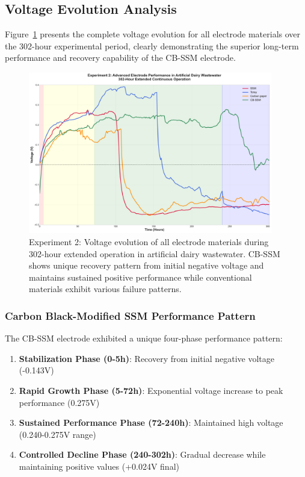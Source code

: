 \documentclass[12pt,a4paper]{article}
\begin{document}
\subsection{Voltage Evolution Analysis}

Figure~\ref{fig:voltage_evolution_exp2} presents the complete voltage evolution for all electrode materials over the 302-hour experimental period, clearly demonstrating the superior long-term performance and recovery capability of the CB-SSM electrode.

\begin{figure}[htbp]
\centering
\includegraphics[width=0.95\textwidth]{experiment_2_voltage_evolution.pdf}
\caption{Experiment 2: Voltage evolution of all electrode materials during 302-hour extended operation in artificial dairy wastewater. CB-SSM shows unique recovery pattern from initial negative voltage and maintains sustained positive performance while conventional materials exhibit various failure patterns.}
\label{fig:voltage_evolution_exp2}
\end{figure}

\subsubsection{Carbon Black-Modified SSM Performance Pattern}

The CB-SSM electrode exhibited a unique four-phase performance pattern:

\begin{enumerate}
    \item \textbf{Stabilization Phase (0-5h)}: Recovery from initial negative voltage (-0.143V)
    \item \textbf{Rapid Growth Phase (5-72h)}: Exponential voltage increase to peak performance (0.275V)
    \item \textbf{Sustained Performance Phase (72-240h)}: Maintained high voltage (0.240-0.275V range)
    \item \textbf{Controlled Decline Phase (240-302h)}: Gradual decrease while maintaining positive values (+0.024V final)
\end{enumerate}
\end{document}

